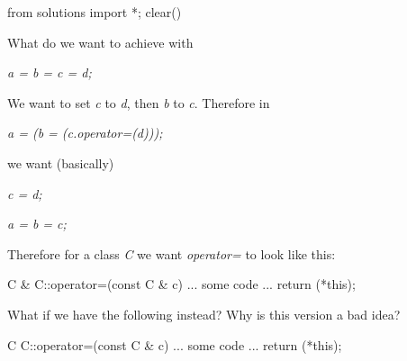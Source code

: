 \begin{python0}
from solutions import *; clear()
\end{python0}

What do we want to achieve with

\textit{a = b = c = d;}

We want to set \textit{c} to \textit{d}, then \textit{b} to \textit{c}.
Therefore in

\textit{a = (b = (c.operator=(d)));}

we want (basically)

\textit{c = d;}

\textit{a = b = c;}

Therefore for a class \textit{C} we want \textit{operator=} to look like
this:

\begin{consolethree}[escapeinside=||]
C & C::operator=(const C & c)
{
    ... some code ...
    return (*this);
}
\end{consolethree}

What if we have the following instead? Why is this version a bad idea?

\begin{consolethree}[escapeinside=||]
C C::operator=(const C & c)
{
    ... some code ...
    return (*this);
}
\end{consolethree}


